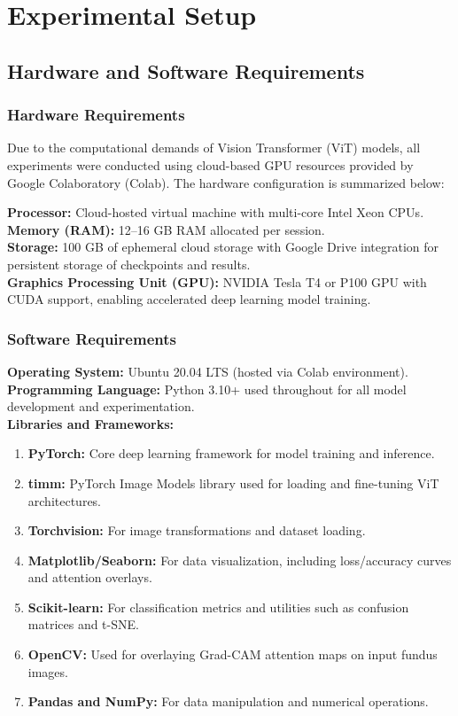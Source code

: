 \documentclass[a4paper,12pt]{report}
\begin{document}
\chapter{Experimental Setup}

\section{Hardware and Software Requirements}

\subsection{Hardware Requirements}

Due to the computational demands of Vision Transformer (ViT) models, all experiments were conducted using cloud-based GPU resources provided by Google Colaboratory (Colab). The hardware configuration is summarized below:

\textbf{Processor:} Cloud-hosted virtual machine with multi-core Intel Xeon CPUs. \\
\textbf{Memory (RAM):} 12--16 GB RAM allocated per session. \\
\textbf{Storage:} 100 GB of ephemeral cloud storage with Google Drive integration for persistent storage of checkpoints and results. \\
\textbf{Graphics Processing Unit (GPU):} NVIDIA Tesla T4 or P100 GPU with CUDA support, enabling accelerated deep learning model training.

\subsection{Software Requirements}

\textbf{Operating System:} Ubuntu 20.04 LTS (hosted via Colab environment). \\
\textbf{Programming Language:} Python 3.10+ used throughout for all model development and experimentation. \\
\textbf{Libraries and Frameworks:}
\begin{enumerate}
    \item \textbf{PyTorch:} Core deep learning framework for model training and inference.
    \item \textbf{timm:} PyTorch Image Models library used for loading and fine-tuning ViT architectures.
    \item \textbf{Torchvision:} For image transformations and dataset loading.
    \item \textbf{Matplotlib/Seaborn:} For data visualization, including loss/accuracy curves and attention overlays.
    \item \textbf{Scikit-learn:} For classification metrics and utilities such as confusion matrices and t-SNE.
    \item \textbf{OpenCV:} Used for overlaying Grad-CAM attention maps on input fundus images.
    \item \textbf{Pandas and NumPy:} For data manipulation and numerical operations.
\end{enumerate}
\end{document}
